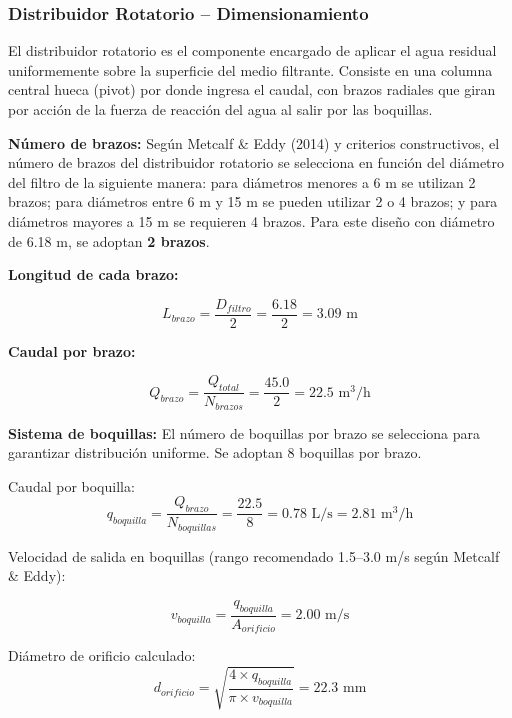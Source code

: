 \documentclass[12pt,a4paper]{article}
\begin{document}
\subsubsection{Distribuidor Rotatorio -- Dimensionamiento}

El distribuidor rotatorio es el componente encargado de aplicar el agua residual uniformemente sobre la superficie del medio filtrante. Consiste en una columna central hueca (pivot) por donde ingresa el caudal, con brazos radiales que giran por acción de la fuerza de reacción del agua al salir por las boquillas.

\textbf{Número de brazos:} Según Metcalf \& Eddy (2014) y criterios constructivos, el número de brazos del distribuidor rotatorio se selecciona en función del diámetro del filtro de la siguiente manera: para diámetros menores a 6 m se utilizan 2 brazos; para diámetros entre 6 m y 15 m se pueden utilizar 2 o 4 brazos; y para diámetros mayores a 15 m se requieren 4 brazos. Para este diseño con diámetro de 6.18 m, se adoptan \textbf{2 brazos}.

\textbf{Longitud de cada brazo:}

\begin{equation}
L_{brazo} = \frac{D_{filtro}}{2} = \frac{6.18}{2} = 3.09 \text{ m}
\end{equation}

\textbf{Caudal por brazo:}

\begin{equation}
Q_{brazo} = \frac{Q_{total}}{N_{brazos}} = \frac{45.0}{2} = 22.5 \text{ m}^3\text{/h}
\end{equation}

\textbf{Sistema de boquillas:} El número de boquillas por brazo se selecciona para garantizar distribución uniforme. Se adoptan 8 boquillas por brazo.

Caudal por boquilla:
\begin{equation}
q_{boquilla} = \frac{Q_{brazo}}{N_{boquillas}} = \frac{22.5}{8} = 0.78 \text{ L/s} = 2.81 \text{ m}^3\text{/h}
\end{equation}

Velocidad de salida en boquillas (rango recomendado 1.5--3.0 m/s según Metcalf \& Eddy):

\begin{equation}
v_{boquilla} = \frac{q_{boquilla}}{A_{orificio}} = 2.00 \text{ m/s}
\end{equation}

Diámetro de orificio calculado:
\begin{equation}
d_{orificio} = \sqrt{\frac{4 \times q_{boquilla}}{\pi \times v_{boquilla}}} = 22.3 \text{ mm}
\end{equation}
\end{document}
